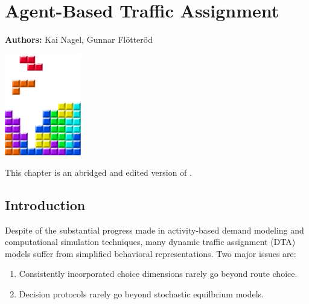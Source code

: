 \def\todoNextRevision#1{{\color{blue}[[``todo next revision'': #1]]}}

\chapter{Agent-Based Traffic Assignment }
\label{ch:abta}

\hfill \textbf{Authors:} Kai Nagel, Gunnar Flötteröd

\begin{center} \includegraphics[width=0.25\textwidth, angle=0]{figures/MATSimBook.png} \end{center}




This chapter is an abridged and edited version of \citet{NagelFloetteroed2009IatbrResourceInBook}.

\section{Introduction}

Despite of the substantial progress made in activity-based demand modeling and computational simulation techniques, many dynamic traffic assignment (DTA) models suffer from simplified behavioral representations. Two major issues are:
\begin{enumerate}
\item Consistently incorporated choice dimensions rarely go beyond route choice.
\item Decision protocols rarely go beyond stochastic equilbrium models.
\end{enumerate}

